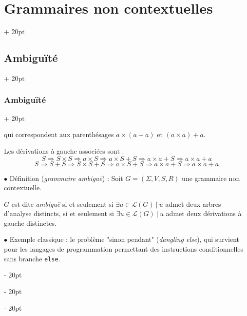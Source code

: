 \documentclass[a4paper, 12pt, twoside]{article}
\newcommand{\lr}[1]{\left( #1 \right)}
\newcommand{\ind}[1][20pt]{\advance\leftskip + #1}
\newcommand{\deind}[1][20pt]{\advance\leftskip - #1}
\newenvironment{indt}[2][20pt]{#2 \par \ind[#1]}{\par \deind} %
\begin{document}
\begin{indt}{\section{Grammaires non contextuelles}}
\begin{indt}{\subsection{Ambiguïté}}
\begin{indt}{\subsubsection{Ambiguïté}}
\begin{center}
                \end{center}

                qui correspondent aux parenthésages $a \times (a + a)$ et $(a \times a) + a$.

                Les dérivations à gauche associées sont :
                \[
                    S
                    \Rightarrow S \times S
                    \Rightarrow a \times S
                    \Rightarrow a \times S + S
                    \Rightarrow a \times a + S
                    \Rightarrow a \times a + a
                \]
                \[
                    S
                    \Rightarrow S + S
                    \Rightarrow S \times S + S
                    \Rightarrow a \times S + S
                    \Rightarrow a \times a + S
                    \Rightarrow a \times a + a
                \]

                \vspace{12pt}
                
                $\bullet$ Définition (\textit{grammaire ambiguë}) :
                Soit $G = \lr{\Sigma, V, S, R}$ une grammaire non contextuelle.

                $G$ est dite \emph{ambiguë} si et seulement si $\exists u \in \mathcal L(G)\ |\ u$ admet deux arbres d'analyse distincts, si et seulement si  $\exists u \in \mathcal L(G)\ |\ u$ admet deux dérivations à gauche distinctes.

                \vspace{12pt}
                
                $\bullet$ Exemple classique : le problème "sinon pendant" (\textit{dangling else}), qui survient pour les langages de programmation permettant des instructions conditionnelles sans branche \texttt{else}.


\end{indt}
\end{indt}
\end{indt}
\end{document}
